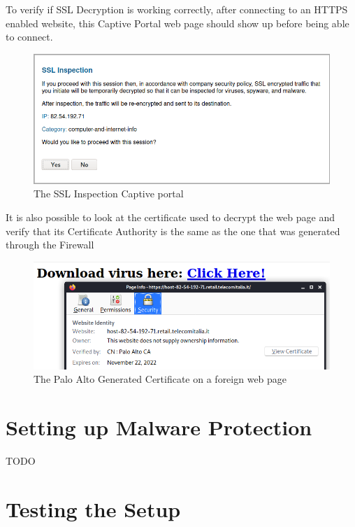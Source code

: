 \newpage

To verify if SSL Decryption is working correctly, after connecting to an HTTPS enabled website, this Captive Portal web page should show up before being able to connect.

\begin{figure}[!h]
\centering
 \includegraphics[width=13cm]{img/ssl_inspection_result.png}
	\caption{The SSL Inspection Captive portal }\label{SSL Inspection Page}
\end{figure}

It is also possible to look at the certificate used to decrypt the web page and verify that its Certificate Authority is the same as the one that was generated through the Firewall

\begin{figure}[h!]
 \centering
 \includegraphics[width=13cm]{img/pa_certificate.png}
 \caption{The Palo Alto Generated Certificate on a foreign web page}
 \label{fig: PaloAlto certificate}
\end{figure}


\newpage

\section{Setting up Malware Protection}

TODO

\section{Testing the Setup}

